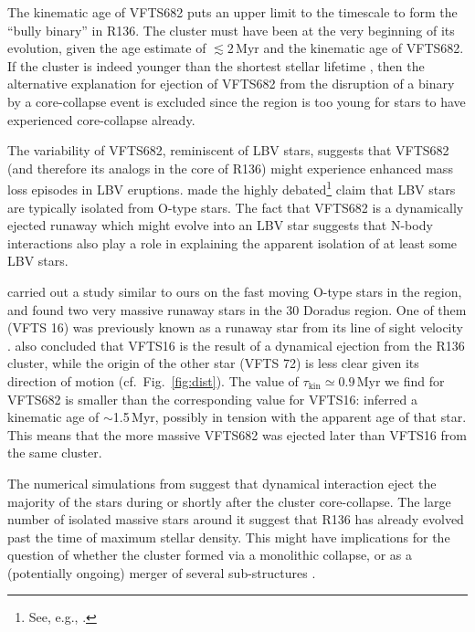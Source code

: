 \documentclass[apjl,twocolumn]{emulateapj}
\DeclareRobustCommand{\Figref}[1]{Fig.~\ref{#1}}
\begin{document}
The kinematic age of VFTS682 puts an
upper limit to the timescale to form the ``bully binary'' in
R136. The cluster must have been at the very beginning of its
evolution, given the age estimate of $\lesssim 2$\,Myr
\citep[][]{crowther:10,sabbi:12} and the kinematic age of VFTS682. If the
cluster is indeed younger than the shortest stellar lifetime
\citep[$\sim$3\,Myr, e.g.,][]{brott:11, zapartas:17}, then the alternative
explanation for ejection of VFTS682 from the disruption of a binary
by a core-collapse event is excluded since the region is too young for stars
to have experienced core-collapse already.

The variability of VFTS682, reminiscent of LBV stars, suggests
that VFTS682 (and therefore its analogs in the core of R136) might
experience enhanced mass loss episodes in LBV eruptions. \citet{smith:15} made the highly
debated\footnote{See, e.g., \cite{humphreys:16, davidson:16, smith:16}.}
claim that LBV stars are typically isolated from O-type stars. The fact that VFTS682 is a dynamically
ejected runaway which might evolve into an LBV star suggests that
N-body interactions also play a role in explaining the apparent
isolation of at least some LBV stars. 


\citet{lennon:18} carried out a study similar to ours on the fast
moving O-type stars
in the region, and found two very massive runaway stars in the 30 Doradus region. One of them (VFTS 16)
was previously known as a runaway star from its line of sight velocity
\citep[][]{evans:10}. \citet{lennon:18} also concluded that VFTS16 is 
the result of a dynamical ejection from the R136 cluster, while the
origin of the other star (VFTS 72) is less clear given its direction
of motion (cf.~\Figref{fig:dist}). The value of $\tau_\mathrm{kin}\simeq0.9$\,Myr we find for
VFTS682 is smaller than the
corresponding value for VFTS16: \cite{lennon:18} inferred a kinematic
age of $\sim$1.5\,Myr, possibly in tension with the apparent age of that star. This means that the more
massive VFTS682 was ejected later than VFTS16 from the same cluster.

The numerical simulations from \cite{oh:16} suggest that dynamical
interaction eject the majority of the stars during or shortly after the cluster
core-collapse. The large number of isolated massive stars around it
suggest that R136 has already evolved past the
time of maximum stellar density. This might have implications for the
question of whether the cluster formed via a monolithic collapse, or
as a (potentially ongoing) merger of several sub-structures \citep[e.g.,][]{sabbi:12}.
\end{document}
